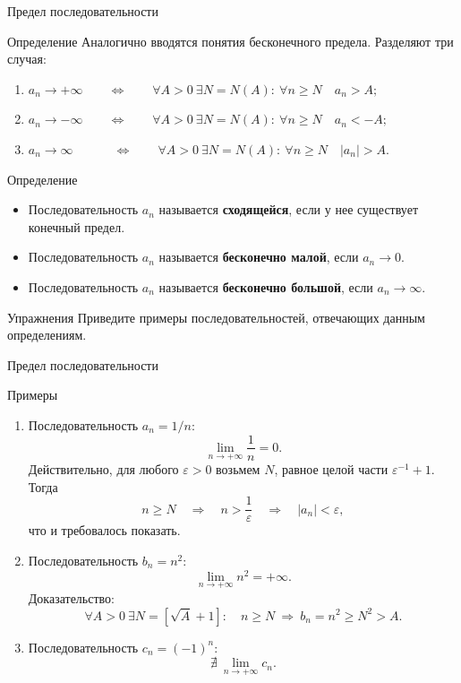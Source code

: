 \documentclass[8pt]{beamer}
\begin{document}
\begin{frame}{Предел последовательности}
\begin{block}{Определение}
Аналогично вводятся понятия бесконечного предела. Разделяют три случая:
\begin{enumerate}
\item $a_n\to +\infty \qquad \Leftrightarrow \qquad 
\forall A>0\ \exists N=N(A):\ \forall n\ge N \quad a_n > A;$
\item  $a_n\to -\infty \qquad \Leftrightarrow \qquad 
\forall A>0\ \exists N=N(A):\ \forall n\ge N \quad a_n < -A;$
\item  $a_n\to \infty \phantom{-} \qquad \Leftrightarrow \qquad 
\forall A>0\ \exists N=N(A):\ \forall n\ge N \quad |a_n| > A.$
\end{enumerate}
\end{block}

\begin{block}{Определение}
\begin{itemize}
\item Последовательность $a_n$ называется {\bf сходящейся}, если у нее существует конечный предел.
\item Последовательность $a_n$ называется {\bf бесконечно малой}, если $a_n\to 0$.
\item Последовательность $a_n$ называется {\bf бесконечно большой}, если $a_n\to \infty$.
\end{itemize}
\end{block}

\begin{block}{Упражнения}
Приведите примеры последовательностей, отвечающих данным определениям.
\end{block}

\end{frame}

\begin{frame}{Предел последовательности}
\begin{block}{Примеры}
\begin{enumerate}
\item Последовательность $a_n=1/n$:
$$\lim_{n\to+\infty}\frac{1}{n}=0.$$
Действительно, для любого $\varepsilon>0$ возьмем $N$, равное целой части $\varepsilon^{-1}+1$. Тогда
$$n\ge N \quad\Rightarrow\quad n> \frac{1}{\varepsilon} \quad\Rightarrow\quad |a_n|<\varepsilon,$$
что и требовалось показать.
\item Последовательность $b_n=n^2$:
$$\lim_{n\to+\infty}n^2=+\infty.$$
Доказательство:
$$\forall A>0\ \exists N=[\sqrt{A}+1]: \quad n\ge N\ \Rightarrow\ b_n=n^2\ge N^2>A.$$
\item Последовательность $c_n=(-1)^n$:
$$\nexists\  \lim_{n\to+\infty}c_n.$$
\end{enumerate}
\end{block}

\end{frame}
\end{document}
